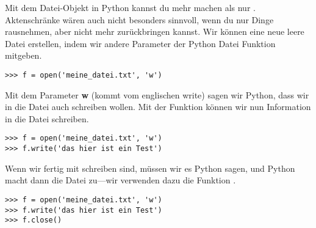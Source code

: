 Mit dem Datei-Objekt in Python kannst du mehr machen als nur . Aktenschränke wären auch nicht besonders sinnvoll, wenn du nur Dinge rausnehmen, aber nicht mehr zurückbringen kannst. Wir können eine neue leere Datei erstellen, indem wir andere Parameter der Python Datei Funktion mitgeben.

\begin{Verbatim}[frame=single]
>>> f = open('meine_datei.txt', 'w')
\end{Verbatim}

Mit dem Parameter \textbf{w} (kommt vom englischen write) sagen wir Python, dass wir in die Datei auch schreiben wollen. Mit der Funktion  können wir nun Information in die Datei schreiben.

\begin{Verbatim}[frame=single]
>>> f = open('meine_datei.txt', 'w')
>>> f.write('das hier ist ein Test')
\end{Verbatim}

Wenn wir fertig mit schreiben sind, müssen wir es Python sagen, und Python macht dann die Datei zu---wir verwenden dazu die Funktion .

\begin{Verbatim}[frame=single, label= alle Befehle zusammengefasst]
>>> f = open('meine_datei.txt', 'w')
>>> f.write('das hier ist ein Test')
>>> f.close()
\end{Verbatim}

